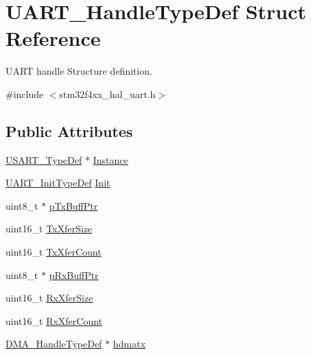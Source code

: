 \hypertarget{struct_u_a_r_t___handle_type_def}{}\section{U\+A\+R\+T\+\_\+\+Handle\+Type\+Def Struct Reference}
\label{struct_u_a_r_t___handle_type_def}


U\+A\+RT handle Structure definition.  




{\ttfamily \#include $<$stm32f4xx\+\_\+hal\+\_\+uart.\+h$>$}

\subsection*{Public Attributes}
\begin{DoxyCompactItemize}
\item 
\hyperlink{struct_u_s_a_r_t___type_def}{U\+S\+A\+R\+T\+\_\+\+Type\+Def} $\ast$ \hyperlink{struct_u_a_r_t___handle_type_def_a02df2e8e2b4d929d5e1b5b96566a9fb6}{Instance}
\item 
\hyperlink{struct_u_a_r_t___init_type_def}{U\+A\+R\+T\+\_\+\+Init\+Type\+Def} \hyperlink{struct_u_a_r_t___handle_type_def_a98a8e13e0b5a227d31ab0a4b346cf4df}{Init}
\item 
uint8\+\_\+t $\ast$ \hyperlink{struct_u_a_r_t___handle_type_def_a79dd401b02d57f1b2d4618744402850c}{p\+Tx\+Buff\+Ptr}
\item 
uint16\+\_\+t \hyperlink{struct_u_a_r_t___handle_type_def_a98e2ea90caba72ac0cd5b1815a5ccb81}{Tx\+Xfer\+Size}
\item 
uint16\+\_\+t \hyperlink{struct_u_a_r_t___handle_type_def_a874ef209c0571231b2e4b951007eefac}{Tx\+Xfer\+Count}
\item 
uint8\+\_\+t $\ast$ \hyperlink{struct_u_a_r_t___handle_type_def_a9541d846ad12e9376ddd0062efe3196c}{p\+Rx\+Buff\+Ptr}
\item 
uint16\+\_\+t \hyperlink{struct_u_a_r_t___handle_type_def_a22782fdbe156661bc9710efd02228746}{Rx\+Xfer\+Size}
\item 
uint16\+\_\+t \hyperlink{struct_u_a_r_t___handle_type_def_ade988f08540556bd89766e4cc2bb4dec}{Rx\+Xfer\+Count}
\item 
\hyperlink{group___d_m_a___exported___types_ga41b754a906b86bce54dc79938970138b}{D\+M\+A\+\_\+\+Handle\+Type\+Def} $\ast$ \hyperlink{struct_u_a_r_t___handle_type_def_a995e0ff8dd7c987cae31b3e153166acb}{hdmatx}
\item 

\end{DoxyCompactItemize}
